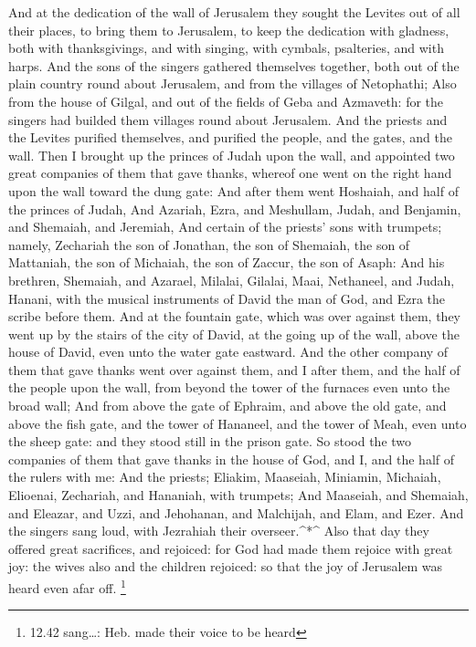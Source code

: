  And at the dedication of the wall of Jerusalem they sought
the Levites out of all their places, to bring them to Jerusalem, to keep
the dedication with gladness, both with thanksgivings, and with singing,
with cymbals, psalteries, and with harps.  And the sons of
the singers gathered themselves together, both out of the plain country
round about Jerusalem, and from the villages of Netophathi;
 Also from the house of Gilgal, and out of the fields of
Geba and Azmaveth: for the singers had builded them villages round about
Jerusalem.  And the priests and the Levites purified
themselves, and purified the people, and the gates, and the wall.
 Then I brought up the princes of Judah upon the wall, and
appointed two great companies of them that gave thanks, whereof one went
on the right hand upon the wall toward the dung gate:  And
after them went Hoshaiah, and half of the princes of Judah,
 And Azariah, Ezra, and Meshullam,  Judah, and
Benjamin, and Shemaiah, and Jeremiah,  And certain of the
priests' sons with trumpets; namely, Zechariah the son of Jonathan, the
son of Shemaiah, the son of Mattaniah, the son of Michaiah, the son of
Zaccur, the son of Asaph:  And his brethren, Shemaiah, and
Azarael, Milalai, Gilalai, Maai, Nethaneel, and Judah, Hanani, with the
musical instruments of David the man of God, and Ezra the scribe before
them.  And at the fountain gate, which was over against
them, they went up by the stairs of the city of David, at the going up
of the wall, above the house of David, even unto the water gate
eastward.  And the other company of them that gave thanks
went over against them, and I after them, and the half of the people
upon the wall, from beyond the tower of the furnaces even unto the broad
wall;  And from above the gate of Ephraim, and above the
old gate, and above the fish gate, and the tower of Hananeel, and the
tower of Meah, even unto the sheep gate: and they stood still in the
prison gate.  So stood the two companies of them that gave
thanks in the house of God, and I, and the half of the rulers with me:
 And the priests; Eliakim, Maaseiah, Miniamin, Michaiah,
Elioenai, Zechariah, and Hananiah, with trumpets;  And
Maaseiah, and Shemaiah, and Eleazar, and Uzzi, and Jehohanan, and
Malchijah, and Elam, and Ezer. And the singers sang loud, with Jezrahiah
their overseer.\^{}*\^{}  Also that day they offered great
sacrifices, and rejoiced: for God had made them rejoice with great joy:
the wives also and the children rejoiced: so that the joy of Jerusalem
was heard even afar off. \footnote{12.42 sang\ldots: Heb. made their
  voice to be heard}

